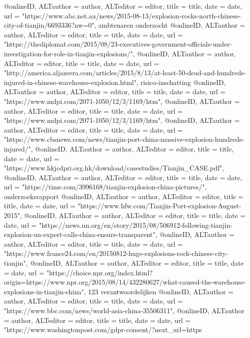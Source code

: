 {{{{{{{@online{ID,	ALTauthor = {author},	ALTeditor = {editor},	title = {title},	date = {date},	url = {"https://www.abc.net.au/news/2015-08-13/explosion-rocks-north-chinese-city-of-tianjin/6693336?nw=0"},}
ambtenaren onderzocht
@online{ID,	ALTauthor = {author},	ALTeditor = {editor},	title = {title},	date = {date},	url = {"https://thediplomat.com/2015/08/23-executives-government-officials-under-investigation-for-role-in-tianjin-explosions/"},}
@online{ID,	ALTauthor = {author},	ALTeditor = {editor},	title = {title},	date = {date},	url = {"http://america.aljazeera.com/articles/2015/8/13/at-least-50-dead-and-hundreds-injured-in-chinese-warehouse-explosion.html"},}
risico-inschatting
@online{ID,	ALTauthor = {author},	ALTeditor = {editor},	title = {title},	date = {date},	url = {"https://www.mdpi.com/2071-1050/12/3/1169/htm"},}
@online{ID,	ALTauthor = {author},	ALTeditor = {editor},	title = {title},	date = {date},	url = {"https://www.mdpi.com/2071-1050/12/3/1169/htm"},}
@online{ID,	ALTauthor = {author},	ALTeditor = {editor},	title = {title},	date = {date},	url = {"https://www.cbsnews.com/news/tianjin-port-china-massive-explosion-hundreds-injured/"},}
@online{ID,	ALTauthor = {author},	ALTeditor = {editor},	title = {title},	date = {date},	url = {"https://www.hkjcdpri.org.hk/download/casestudies/Tianjin_CASE.pdf"},}
@online{ID,	ALTauthor = {author},	ALTeditor = {editor},	title = {title},	date = {date},	url = {"https://time.com/3996168/tianjin-explosion-china-pictures/"},}
onderzoeksrapport
@online{ID,	ALTauthor = {author},	ALTeditor = {editor},	title = {title},	date = {date},	url = {"https://www.hfw.com/Tianjin-Port-explosion-August-2015"},}
@online{ID,	ALTauthor = {author},	ALTeditor = {editor},	title = {title},	date = {date},	url = {"https://news.un.org/en/story/2015/08/506912-following-tianjin-explosion-un-expert-calls-china-ensure-transparent"},}
@online{ID,	ALTauthor = {author},	ALTeditor = {editor},	title = {title},	date = {date},	url = {"https://www.france24.com/en/20150812-huge-explosions-rock-chinese-city-tianjin"},}
@online{ID,	ALTauthor = {author},	ALTeditor = {editor},	title = {title},	date = {date},	url = {"https://choice.npr.org/index.html?origin=https://www.npr.org/2015/08/14/432280627/what-caused-the-warehouse-explosions-in-tianjin-china"},}
123 verantwoordelijken
@online{ID,	ALTauthor = {author},	ALTeditor = {editor},	title = {title},	date = {date},	url = {"https://www.bbc.com/news/world-asia-china-35506311"},}
@online{ID,	ALTauthor = {author},	ALTeditor = {editor},	title = {title},	date = {date},	url = {"https://www.washingtonpost.com/gdpr-consent/?next_url=https%
}}}}}}}}}
